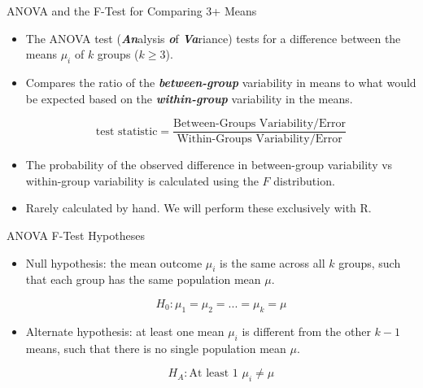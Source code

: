 \documentclass[
  ignorenonframetext,
]{beamer}
\providecommand{\tightlist}{%
  \setlength{\itemsep}{0pt}\setlength{\parskip}{0pt}}\usepackage{longtable,booktabs,array}
\begin{document}
\begin{frame}{ANOVA and the F-Test for Comparing 3+ Means}
\label{anova-and-the-f-test-for-comparing-3-means}
\begin{itemize}
\tightlist
\item
  The ANOVA test (\textbf{\emph{An}}alysis \textbf{\emph{o}}f
  \textbf{\emph{Va}}riance) tests for a difference between the means
  \(\mu_i\) of \(k\) groups (\(k \ge 3\)).
\end{itemize}

\pause

\begin{itemize}
\item
  Compares the ratio of the \textbf{\emph{between-group}} variability in
  means to what would be expected based on the
  \textbf{\emph{within-group}} variability in the means.

  \[
    \text{test statistic}=\frac{\text{Between-Groups Variability/Error}}{\text{Within-Groups Variability/Error}}
  \]
\end{itemize}

\pause

\begin{itemize}
\tightlist
\item
  The probability of the observed difference in between-group
  variability vs within-group variability is calculated using the \(F\)
  distribution.
\end{itemize}

\pause

\begin{itemize}
\tightlist
\item
  Rarely calculated by hand. We will perform these exclusively with R.
\end{itemize}
\end{frame}

\begin{frame}{ANOVA F-Test Hypotheses}
\label{anova-f-test-hypotheses}
\begin{itemize}
\item
  Null hypothesis: the mean outcome \(\mu_i\) is the same across all
  \(k\) groups, such that each group has the same population mean
  \(\mu\).

  \[
    H_0 \colon \mu_1=\mu_2=...=\mu_k=\mu
  \]
\end{itemize}

\pause

\begin{itemize}
\item
  Alternate hypothesis: at least one mean \(\mu_i\) is different from
  the other \(k-1\) means, such that there is no single population mean
  \(\mu\).

  \[
    H_A \colon \text{At least 1 } \mu_i \ne \mu
  \]
\end{itemize}
\end{frame}
\end{document}
